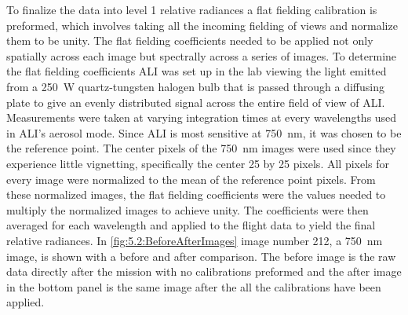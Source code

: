To finalize the data into level 1 relative radiances a flat fielding calibration is preformed, which involves taking all the incoming fielding of views and normalize them to be unity. The flat fielding coefficients needed to be applied not only spatially across each image but spectrally across a series of images. To determine the flat fielding coefficients ALI was set up in the lab viewing the light emitted from a 250~W quartz-tungsten halogen bulb that is passed through a diffusing plate to give an evenly distributed signal across the entire field of view of ALI. Measurements were taken at varying integration times at every wavelengths used in ALI's aerosol mode. Since ALI is most sensitive at 750~nm, it was chosen to be the reference point. The center pixels of the 750~nm images were used since they experience little vignetting, specifically the center 25 by 25 pixels. All pixels for every image were normalized to the mean of the reference point pixels. From these normalized images, the flat fielding coefficients were the values needed to multiply the normalized images to achieve unity. The coefficients were then averaged for each wavelength and applied to the flight data to yield the final relative radiances. In \autoref{fig:5.2:BeforeAfterImages} image number 212, a 750~nm image, is shown with a before and after comparison. The before image is the raw data directly after the mission with no calibrations preformed and the after image in the bottom panel is the same image after the all the calibrations have been applied.

